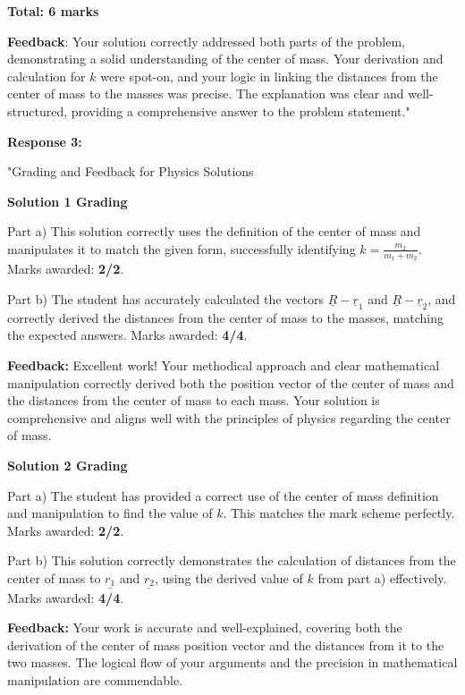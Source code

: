 \documentclass[a4paper,11pt]{article}
\begin{document}
\textbf{Total: 6 marks}

\textbf{Feedback}: Your solution correctly addressed both parts of the problem, demonstrating a solid understanding of the center of mass. Your derivation and calculation for \( k \) were spot-on, and your logic in linking the distances from the center of mass to the masses was precise. The explanation was clear and well-structured, providing a comprehensive answer to the problem statement."

\textbf{Response 3:}

"Grading and Feedback for Physics Solutions

\textbf{Solution 1 Grading}

Part a) This solution correctly uses the definition of the center of mass and manipulates it to match the given form, successfully identifying \( k = \frac{m_2}{m_1 + m_2} \). Marks awarded: \textbf{2/2}.

Part b) The student has accurately calculated the vectors \( \underline{R} - \underline{r}_1 \) and \( \underline{R} - \underline{r}_2 \), and correctly derived the distances from the center of mass to the masses, matching the expected answers. Marks awarded: \textbf{4/4}.

\textbf{Feedback:} Excellent work! Your methodical approach and clear mathematical manipulation correctly derived both the position vector of the center of mass and the distances from the center of mass to each mass. Your solution is comprehensive and aligns well with the principles of physics regarding the center of mass.

\hrulefill

\textbf{Solution 2 Grading}

Part a) The student has provided a correct use of the center of mass definition and manipulation to find the value of \( k \). This matches the mark scheme perfectly. Marks awarded: \textbf{2/2}.

Part b) This solution correctly demonstrates the calculation of distances from the center of mass to \( \underline{r_{1}} \) and \( \underline{r_{2}} \), using the derived value of \( k \) from part a) effectively. Marks awarded: \textbf{4/4}.

\textbf{Feedback:} Your work is accurate and well-explained, covering both the derivation of the center of mass position vector and the distances from it to the two masses. The logical flow of your arguments and the precision in mathematical manipulation are commendable.
\end{document}
